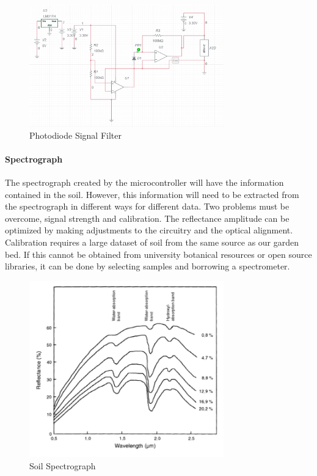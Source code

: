 \begin{figure}[H]
    \caption{Photodiode Signal Filter}
    \centering
    \includegraphics[width=0.75\textwidth]{images/ElectricalSignalFilteringSD1.png}
\end{figure}

\paragraph{Spectrograph} The spectrograph created by the microcontroller will have the information contained in the soil. However, this information will need to be extracted from the spectrograph in different ways for different data. Two problems must be overcome, signal strength and calibration. The reflectance amplitude can be optimized by making adjustments to the circuitry and the optical alignment. Calibration requires a large dataset of soil from the same source as our garden bed. If this cannot be obtained from university botanical resources or open source libraries, it can be done by selecting samples and borrowing a spectrometer.

\begin{figure}[H]
    \caption{Soil Spectrograph}
    \centering
    \includegraphics[width=0.75\textwidth]{images/GenericSoilSpectra.png}
\end{figure}


